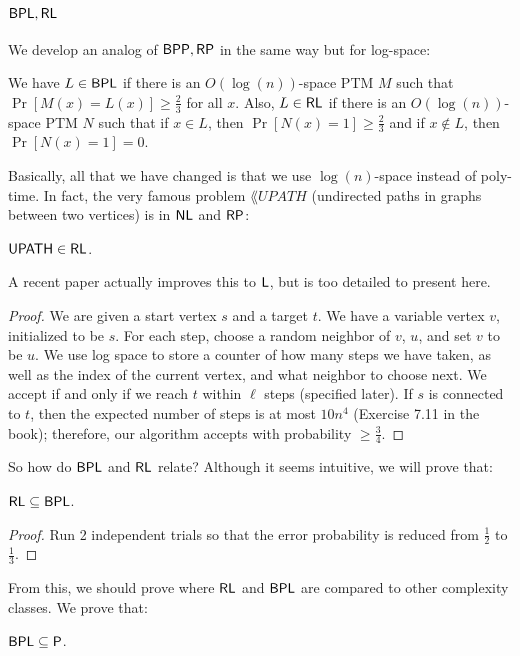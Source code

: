 \newcommand{\UPATH}{\lang{UPATH}}
\subsection{${\mathsf{BPL}}, {\mathsf{RL}}$}
We develop an analog of ${\mathsf{BPP}}, {\mathsf{RP}}$ in the same way but for log-space:
\begin{definition}
We have $L \in {\ensuremath{\mathsf{BPL}}}$ if there is an $O(\log(n))$-space PTM $M$ such that $\Pr[M(x) = L(x)] \ge \frac{2}{3}$ for all $x$. Also, $L \in {\ensuremath{\mathsf{RL}}}$ if there is an $O(\log(n))$-space PTM $N$ such that if $x \in L$, then $\Pr[N(x) = 1] \ge \frac{2}{3}$ and if $x \notin L$, then $\Pr[N(x) = 1] = 0$. 
\end{definition}
Basically, all that we have changed is that we use $\log(n)$-space instead of poly-time. In fact, the very famous problem $\UPATH$ (undirected paths in graphs between two vertices) is in ${\mathsf{NL}}$ and ${\mathsf{RP}}$:
\begin{theorem}
$\UPATH \in \RL$.
\end{theorem}
A recent paper actually improves this to ${\mathsf{L}}$, but is too detailed to present here.
\begin{proof}
We are given a start vertex $s$ and a target $t$. We have a variable vertex $v$, initialized to be $s$. For each step, choose a random neighbor of $v$, $u$, and set $v$ to be $u$. We use log space to store a counter of how many steps we have taken, as well as the index of the current vertex, and what neighbor to choose next. We accept if and only if we reach $t$ within $\ell$ steps (specified later). If $s$ is connected to $t$, then the expected number of steps is at most $10n^4$ (Exercise 7.11 in the book); therefore, our algorithm accepts with probability $\ge \frac{3}{4}$. 
\end{proof}
So how do ${\mathsf{BPL}}$ and ${\mathsf{RL}}$ relate? Although it seems intuitive, we will prove that:
\begin{theorem}
${\mathsf{RL}} \subseteq {\ensuremath{\mathsf{BPL}}}$.
\end{theorem}
\begin{proof}
Run 2 independent trials so that the error probability is reduced from $\frac{1}{2}$ to $\frac{1}{3}$. 
\end{proof}
From this, we should prove where ${\mathsf{RL}}$ and ${\mathsf{BPL}}$ are compared to other complexity classes. We prove that:
\begin{theorem}
${\mathsf{BPL}} \subseteq {\ensuremath{\mathsf{P}}}$.
\end{theorem}
